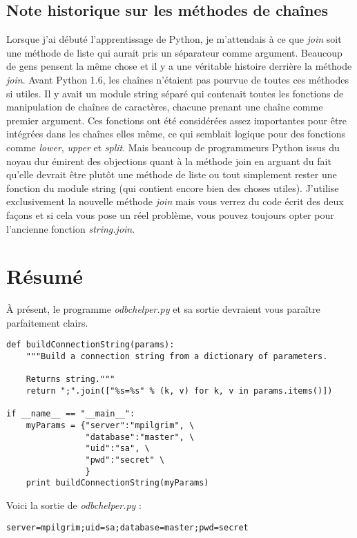 \subsection{Note historique sur les méthodes de chaînes}

Lorsque j'ai débuté l'apprentissage de Python, je m'attendais à ce que \emph{join} soit une méthode de liste qui aurait pris un séparateur comme argument. Beaucoup de gens pensent la même chose et il y a une véritable histoire derrière la méthode \emph{join}. Avant Python 1.6, les chaînes n'étaient pas pourvue de toutes ces méthodes si utiles. Il y avait un module string séparé qui contenait toutes les fonctions de manipulation de chaînes de caractères, chacune prenant une chaîne comme premier argument. Ces fonctions ont été considérées assez importantes pour être intégrées dans les chaînes elles même, ce qui semblait logique pour des fonctions comme \emph{lower}, \emph{upper} et \emph{split}. Mais beaucoup de programmeurs Python issus du noyau dur émirent des objections quant à la méthode join en arguant du fait qu'elle devrait être plutôt une méthode de liste ou tout simplement rester une fonction du module string (qui contient encore bien des choses utiles). J'utilise exclusivement la nouvelle méthode \emph{join} mais vous verrez du code écrit des deux façons et si cela vous pose un réel problème, vous pouvez toujours opter pour l'ancienne fonction \emph{string.join}.

\section{Résumé}\label{Résumé}

À présent, le programme \emph{odbchelper.py} et sa sortie devraient vous paraître
parfaitement clairs.

\begin{lstlisting}
def buildConnectionString(params):
    """Build a connection string from a dictionary of parameters.

    Returns string."""
    return ";".join(["%s=%s" % (k, v) for k, v in params.items()])

if __name__ == "__main__":
    myParams = {"server":"mpilgrim", \
                "database":"master", \
                "uid":"sa", \
                "pwd":"secret" \
                }
    print buildConnectionString(myParams)
\end{lstlisting}

Voici la sortie de \emph{odbchelper.py} :
\begin{lstlisting}[style=none]
server=mpilgrim;uid=sa;database=master;pwd=secret
\end{lstlisting}

